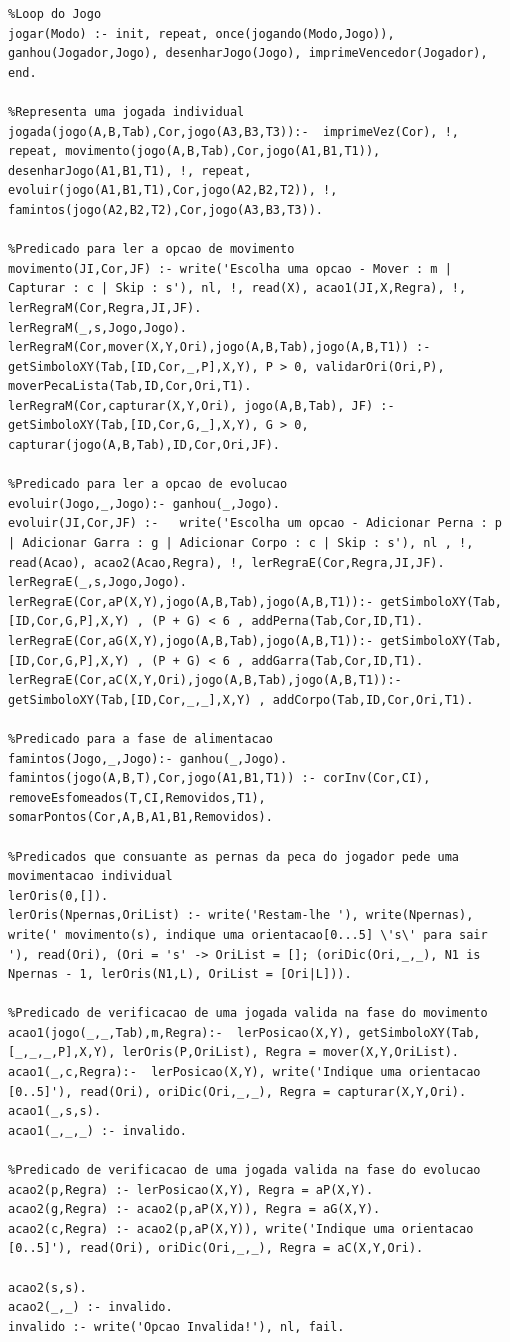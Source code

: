 \documentclass[a4paper]{article}
\begin{document}
\begin{lstlisting}
%Loop do Jogo
jogar(Modo) :- init, repeat, once(jogando(Modo,Jogo)), ganhou(Jogador,Jogo), desenharJogo(Jogo), imprimeVencedor(Jogador), end.

%Representa uma jogada individual
jogada(jogo(A,B,Tab),Cor,jogo(A3,B3,T3)):-  imprimeVez(Cor), !, repeat, movimento(jogo(A,B,Tab),Cor,jogo(A1,B1,T1)), desenharJogo(A1,B1,T1), !, repeat, evoluir(jogo(A1,B1,T1),Cor,jogo(A2,B2,T2)), !, famintos(jogo(A2,B2,T2),Cor,jogo(A3,B3,T3)).

%Predicado para ler a opcao de movimento
movimento(JI,Cor,JF) :- write('Escolha uma opcao - Mover : m | Capturar : c | Skip : s'), nl, !, read(X), acao1(JI,X,Regra), !, lerRegraM(Cor,Regra,JI,JF).
lerRegraM(_,s,Jogo,Jogo).
lerRegraM(Cor,mover(X,Y,Ori),jogo(A,B,Tab),jogo(A,B,T1)) :- getSimboloXY(Tab,[ID,Cor,_,P],X,Y), P > 0, validarOri(Ori,P), moverPecaLista(Tab,ID,Cor,Ori,T1).
lerRegraM(Cor,capturar(X,Y,Ori), jogo(A,B,Tab), JF) :-  getSimboloXY(Tab,[ID,Cor,G,_],X,Y), G > 0, capturar(jogo(A,B,Tab),ID,Cor,Ori,JF).

%Predicado para ler a opcao de evolucao
evoluir(Jogo,_,Jogo):- ganhou(_,Jogo).
evoluir(JI,Cor,JF) :-   write('Escolha um opcao - Adicionar Perna : p | Adicionar Garra : g | Adicionar Corpo : c | Skip : s'), nl , !, read(Acao), acao2(Acao,Regra), !, lerRegraE(Cor,Regra,JI,JF).
lerRegraE(_,s,Jogo,Jogo).
lerRegraE(Cor,aP(X,Y),jogo(A,B,Tab),jogo(A,B,T1)):- getSimboloXY(Tab,[ID,Cor,G,P],X,Y) , (P + G) < 6 , addPerna(Tab,Cor,ID,T1).
lerRegraE(Cor,aG(X,Y),jogo(A,B,Tab),jogo(A,B,T1)):- getSimboloXY(Tab,[ID,Cor,G,P],X,Y) , (P + G) < 6 , addGarra(Tab,Cor,ID,T1).
lerRegraE(Cor,aC(X,Y,Ori),jogo(A,B,Tab),jogo(A,B,T1)):- getSimboloXY(Tab,[ID,Cor,_,_],X,Y) , addCorpo(Tab,ID,Cor,Ori,T1).

%Predicado para a fase de alimentacao
famintos(Jogo,_,Jogo):- ganhou(_,Jogo).
famintos(jogo(A,B,T),Cor,jogo(A1,B1,T1)) :- corInv(Cor,CI), removeEsfomeados(T,CI,Removidos,T1), somarPontos(Cor,A,B,A1,B1,Removidos).

%Predicados que consuante as pernas da peca do jogador pede uma movimentacao individual
lerOris(0,[]).
lerOris(Npernas,OriList) :- write('Restam-lhe '), write(Npernas), write(' movimento(s), indique uma orientacao[0...5] \'s\' para sair '), read(Ori), (Ori = 's' -> OriList = []; (oriDic(Ori,_,_), N1 is Npernas - 1, lerOris(N1,L), OriList = [Ori|L])).

%Predicado de verificacao de uma jogada valida na fase do movimento
acao1(jogo(_,_,Tab),m,Regra):-  lerPosicao(X,Y), getSimboloXY(Tab,[_,_,_,P],X,Y), lerOris(P,OriList), Regra = mover(X,Y,OriList).
acao1(_,c,Regra):-  lerPosicao(X,Y), write('Indique uma orientacao [0..5]'), read(Ori), oriDic(Ori,_,_), Regra = capturar(X,Y,Ori).
acao1(_,s,s).
acao1(_,_,_) :- invalido.

%Predicado de verificacao de uma jogada valida na fase do evolucao
acao2(p,Regra) :- lerPosicao(X,Y), Regra = aP(X,Y).
acao2(g,Regra) :- acao2(p,aP(X,Y)), Regra = aG(X,Y).
acao2(c,Regra) :- acao2(p,aP(X,Y)), write('Indique uma orientacao [0..5]'), read(Ori), oriDic(Ori,_,_), Regra = aC(X,Y,Ori).

acao2(s,s).
acao2(_,_) :- invalido.
invalido :- write('Opcao Invalida!'), nl, fail.
\end{lstlisting}
\end{document}
